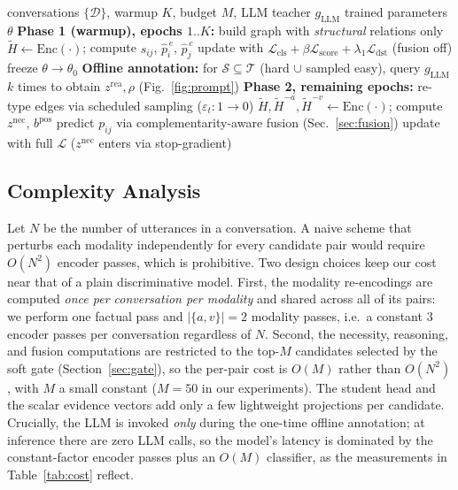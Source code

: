 \documentclass[journal]{IEEEtran}
\newcommand{\Enc}{\mathrm{Enc}}
\begin{document}
\begin{algorithm}[t]
\caption{Two-phase training of the proposed model}
\label{alg:train}
\begin{algorithmic}[1]
\Require conversations $\{\mathcal{D}\}$, warmup $K$, budget $M$, LLM teacher $g_{\mathrm{LLM}}$
\Ensure trained parameters $\theta$
\State \textbf{Phase 1 (warmup), epochs $1..K$:}
  \State build graph with \emph{structural} relations only
  \State $\tilde H\!\gets\!\Enc(\cdot)$; compute $s_{ij}$, $\hat p^{\,e}_i$, $\hat p^{\,c}_j$
  \State update with $\mathcal{L}_{\mathrm{cls}}\!+\!\beta\mathcal{L}_{\mathrm{score}}\!+\!\lambda_1\mathcal{L}_{\mathrm{dst}}$ (fusion off)
\EndFor
\State freeze $\theta\!\to\!\theta_0$
\State \textbf{Offline annotation:} for $\mathcal{S}\subseteq\mathcal{T}$ (hard $\cup$ sampled easy),
query $g_{\mathrm{LLM}}$ $k$ times to obtain $z^{\mathrm{rea}},\rho$ (Fig.~\ref{fig:prompt})
\State \textbf{Phase 2, remaining epochs:}
  \State re-type edges via scheduled sampling ($\varepsilon_t\!:\!1\!\to\!0$)
  \State $\tilde H,\tilde H^{-a},\tilde H^{-v}\!\gets\!\Enc(\cdot)$; compute $z^{\mathrm{nec}}$, $b^{\mathrm{pos}}$
  \State predict $p_{ij}$ via complementarity-aware fusion (Sec.~\ref{sec:fusion})
  \State update with full $\mathcal{L}$ ($z^{\mathrm{nec}}$ enters via stop-gradient)
\EndFor
\end{algorithmic}
\end{algorithm}

\subsection{Complexity Analysis}
\label{sec:complexity}
Let $N$ be the number of utterances in a conversation. A naive scheme that perturbs each
modality independently for every candidate pair would require $O(N^2)$ encoder passes, which
is prohibitive. Two design choices keep our cost near that of a plain discriminative model.
First, the modality re-encodings are computed \emph{once per conversation per modality} and
shared across all of its pairs: we perform one factual pass and $|\{a,v\}|=2$ modality passes,
i.e.\ a constant $3$ encoder passes per conversation regardless of $N$. Second, the necessity,
reasoning, and fusion computations are restricted to the top-$M$ candidates selected by the
soft gate (Section~\ref{sec:gate}), so the per-pair cost is $O(M)$ rather than $O(N^2)$, with
$M$ a small constant ($M=50$ in our experiments). The student head and the scalar evidence
vectors add only a few lightweight projections per candidate. Crucially, the LLM is invoked
\emph{only} during the one-time offline annotation; at inference there are zero LLM calls, so
the model's latency is dominated by the constant-factor encoder passes plus an $O(M)$
classifier, as the measurements in Table~\ref{tab:cost} reflect.
\end{document}

